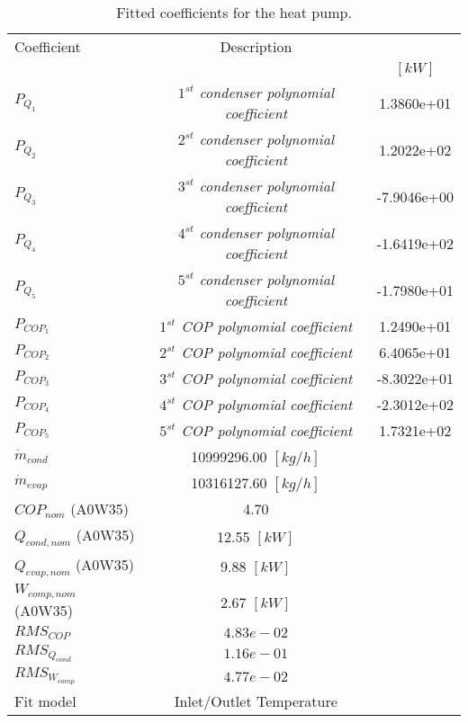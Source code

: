 \documentclass[english]{SPFShortReport}
\author{neha.dimri}
\begin{document}
\begin{table}[!ht]
\centering
\caption{Fitted coefficients for the heat pump.}
\begin{adjustbox}{max width =\textwidth}
\begin{tabular}{l | c c } 
\hline
\hline
Coefficient &Description & \\ 
 & &$[kW]$\\ 
\hline
$P_{Q_{1}}$ & \emph{$1^{st}$ condenser polynomial coefficient}  & 1.3860e+01    \\ 
$P_{Q_{2}}$ & \emph{$2^{st}$ condenser polynomial coefficient}  & 1.2022e+02    \\ 
$P_{Q_{3}}$ & \emph{$3^{st}$ condenser polynomial coefficient}  & -7.9046e+00    \\ 
$P_{Q_{4}}$ & \emph{$4^{st}$ condenser polynomial coefficient}  & -1.6419e+02    \\ 
$P_{Q_{5}}$ & \emph{$5^{st}$ condenser polynomial coefficient}  & -1.7980e+01    \\ 
\hline
$P_{COP_{1}}$ & \emph{$1^{st}$ COP polynomial coefficient}  & 1.2490e+01    \\ 
$P_{COP_{2}}$ & \emph{$2^{st}$ COP polynomial coefficient}  & 6.4065e+01    \\ 
$P_{COP_{3}}$ & \emph{$3^{st}$ COP polynomial coefficient}  & -8.3022e+01    \\ 
$P_{COP_{4}}$ & \emph{$4^{st}$ COP polynomial coefficient}  & -2.3012e+02    \\ 
$P_{COP_{5}}$ & \emph{$5^{st}$ COP polynomial coefficient}  & 1.7321e+02    \\ 
\hline
$\dot m_{cond}$ & 10999296.00 $[kg/h]$ \\ 
$\dot m_{evap}$ & 10316127.60 $[kg/h]$ \\ 
\hline
$COP_{nom}$ (A0W35)& 4.70 \\ 
$Q_{cond,nom}$ (A0W35)& 12.55 $[kW]$\\ 
$Q_{evap,nom}$ (A0W35)& 9.88 $[kW]$\\ 
$W_{comp,nom}$ (A0W35)& 2.67 $[kW]$\\ 
\hline
 $RMS_{COP}$ & $4.83e-02$ \\ 
 $RMS_{Q_{cond}}$ & $1.16e-01$ \\ 
 $RMS_{W_{comp}}$ & $4.77e-02$ \\ 
\hline
Fit model & Inlet/Outlet Temperature\\ 
\hline
\hline
\end{tabular}
\end{adjustbox}
\label{CoefTable}
\end{table}
\end{document}
